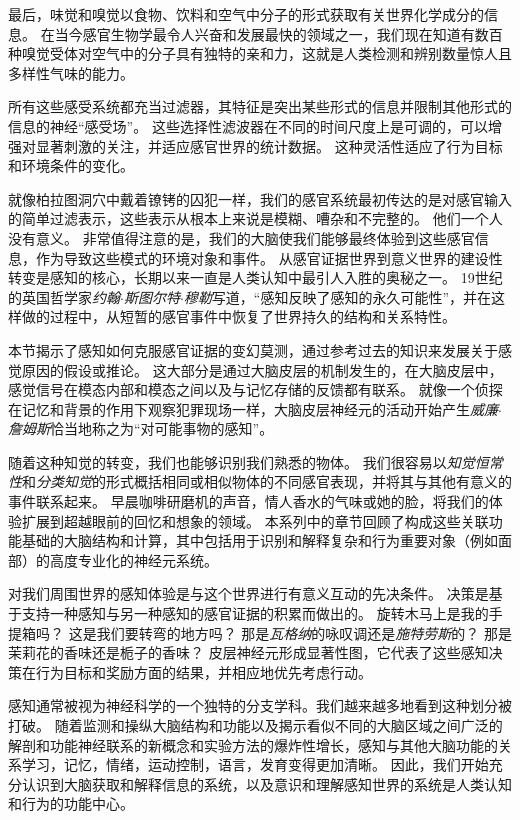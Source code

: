 最后，味觉和嗅觉以食物、饮料和空气中分子的形式获取有关世界化学成分的信息。
在当今感官生物学最令人兴奋和发展最快的领域之一，我们现在知道有数百种嗅觉受体对空气中的分子具有独特的亲和力，这就是人类检测和辨别数量惊人且多样性气味的能力。


所有这些感受系统都充当过滤器，其特征是突出某些形式的信息并限制其他形式的信息的神经“感受场”。
这些选择性滤波器在不同的时间尺度上是可调的，可以增强对显著刺激的关注，并适应感官世界的统计数据。
这种灵活性适应了行为目标和环境条件的变化。


就像柏拉图洞穴中戴着镣铐的囚犯一样，我们的感官系统最初传达的是对感官输入的简单过滤表示，这些表示从根本上来说是模糊、嘈杂和不完整的。
他们一个人没有意义。
非常值得注意的是，我们的大脑使我们能够最终体验到这些感官信息，作为导致这些模式的环境对象和事件。
从感官证据世界到意义世界的建设性转变是感知的核心，长期以来一直是人类认知中最引人入胜的奥秘之一。
19世纪的英国哲学家\textit{约翰$\cdot$斯图尔特$\cdot$穆勒}写道，“感知反映了感知的永久可能性”，并在这样做的过程中，从短暂的感官事件中恢复了世界持久的结构和关系特性。


本节揭示了感知如何克服感官证据的变幻莫测，通过参考过去的知识来发展关于感觉原因的假设或推论。
这大部分是通过大脑皮层的机制发生的，在大脑皮层中，感觉信号在模态内部和模态之间以及与记忆存储的反馈都有联系。
就像一个侦探在记忆和背景的作用下观察犯罪现场一样，大脑皮层神经元的活动开始产生\textit{威廉$\cdot$詹姆斯}恰当地称之为“对可能事物的感知”。


随着这种知觉的转变，我们也能够识别我们熟悉的物体。
我们很容易以\textit{知觉恒常性}和\textit{分类知觉}的形式概括相同或相似物体的不同感官表现，并将其与其他有意义的事件联系起来。
早晨咖啡研磨机的声音，情人香水的气味或她的脸，将我们的体验扩展到超越眼前的回忆和想象的领域。
本系列中的章节回顾了构成这些关联功能基础的大脑结构和计算，其中包括用于识别和解释复杂和行为重要对象（例如面部）的高度专业化的神经元系统。


对我们周围世界的感知体验是与这个世界进行有意义互动的先决条件。
决策是基于支持一种感知与另一种感知的感官证据的积累而做出的。
旋转木马上是我的手提箱吗？
这是我们要转弯的地方吗？
那是\textit{瓦格纳}的咏叹调还是\textit{施特劳斯}的？
那是茉莉花的香味还是栀子的香味？
皮层神经元形成显著性图，它代表了这些感知决策在行为目标和奖励方面的结果，并相应地优先考虑行动。


感知通常被视为神经科学的一个独特的分支学科。我们越来越多地看到这种划分被打破。
随着监测和操纵大脑结构和功能以及揭示看似不同的大脑区域之间广泛的解剖和功能神经联系的新概念和实验方法的爆炸性增长，感知与其他大脑功能的关系学习，记忆，情绪，运动控制，语言，发育变得更加清晰。
因此，我们开始充分认识到大脑获取和解释信息的系统，以及意识和理解感知世界的系统是人类认知和行为的功能中心。



